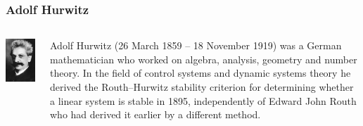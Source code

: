 \documentclass{beamer}
\begin{document}
\begin{frame}
\frametitle{Adolf Hurwitz}
\label{sec-2-5}
\begin{columns}
\begin{column}{0.3\textwidth}
\label{sec-2-5-1}

\includegraphics[width=.9\linewidth]{image/Hurwitz.jpg}
\end{column}
\begin{column}{0.7\textwidth}
\label{sec-2-5-2}

   Adolf Hurwitz (26 March 1859 – 18 November 1919) was a German mathematician who worked on algebra, analysis, geometry and number theory. In the field of control systems and dynamic systems theory he derived the Routh–Hurwitz stability criterion for determining whether a linear system is stable in 1895, independently of Edward John Routh who had derived it earlier by a different method.
\end{column}
\end{columns}
\end{frame}
\end{document}
